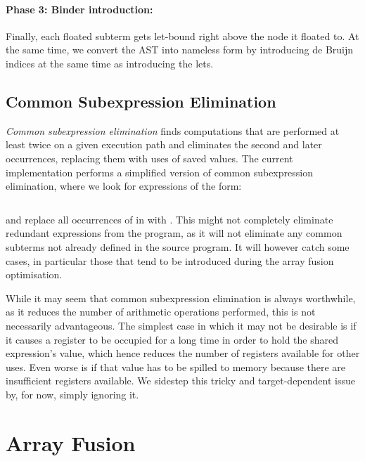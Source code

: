\paragraph{Phase 3: Binder introduction:}

Finally, each floated subterm gets let-bound right above the node it floated to.
At the same time, we convert the AST into nameless  form by
introducing de Bruijn indices at the same time as introducing the lets.\\


\subsection{Common Subexpression Elimination}
\label{sec:cse}

\emph{Common subexpression elimination} finds computations that are performed at
least twice on a given execution path and eliminates the second and later
occurrences, replacing them with uses of saved values. The current
implementation performs a simplified version of common subexpression
elimination, where we look for expressions of the form:
%
\begin{lstlisting}[style=Haskell,numbers=none]
%\bf$\langle$ common subexpression elimination $\rangle$% let x = e1 in [x/e1]e2
\end{lstlisting}
%
and replace all occurrences of  in  with . This might
not completely eliminate redundant expressions from the program, as it will not
eliminate any common subterms not already defined in the source program. It will
however catch some cases, in particular those that tend to be introduced during
the array fusion optimisation.

While it may seem that common subexpression elimination is always worthwhile, as
it reduces the number of arithmetic operations performed, this is not
necessarily advantageous. The simplest case in which it may not be desirable is
if it causes a register to be occupied for a long time in order to hold the
shared expression's value, which hence reduces the number of registers available
for other uses. Even worse is if that value has to be spilled to memory because
there are insufficient registers available. We sidestep this tricky and
target-dependent issue by, for now, simply ignoring it.



\section{Array Fusion}
\label{sec:fusion}


